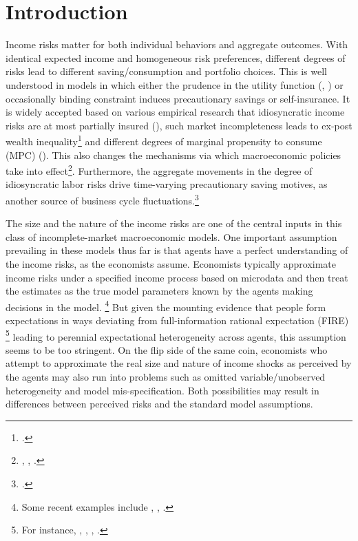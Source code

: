 
    \hypertarget{introduction}{%
\section{Introduction}\label{introduction}}

Income risks matter for both individual behaviors and aggregate
outcomes. With identical expected income and homogeneous risk
preferences, different degrees of risks lead to different
saving/consumption and portfolio choices. This is well understood in
models in which either the prudence in the utility function
(\cite{kimball1990precautionary}, \cite{carroll2001liquidity}) or occasionally binding constraint induces precautionary
savings or self-insurance. It is widely accepted based on various empirical research that
idiosyncratic income risks are at most partially insured
(\cite{blundell_consumption_2008}), such market incompleteness leads
to ex-post wealth inequality\footnote{\cite{ aiyagari1994uninsured,huggett1996wealth,carroll1997nature,krusell1998income}.} and different degrees of marginal
propensity to consume (MPC) (\cite{krueger2016macroeconomics, carroll2017distribution}). This also changes the mechanisms via which macroeconomic policies take into effect\footnote{\cite{krueger2016macroeconomics}, \cite{kaplan2018monetary}, \cite{auclert2019monetary}.}. Furthermore, the aggregate movements in the degree of idiosyncratic labor risks drive time-varying precautionary saving motives, as another source of business cycle fluctuations.\footnote{ \cite{challe2016precautionary, mckay2017time,heathcote2018wealth, kaplan2018microeconomic,den2018unemployment,bayer2019precautionary, acharya2020understanding,ravn2021macroeconomic}.}

The size and the nature of the income risks are one of the central inputs in this class of incomplete-market macroeconomic models. One important assumption prevailing in these models thus far is that agents have a perfect understanding of the
income risks, as the economists assume. Economists typically approximate income risks under a specified income process based on microdata and then treat the estimates
as the true model parameters known by the agents making decisions in the
model. \footnote{Some recent examples include \cite{krueger2016macroeconomics}, \cite{bayer2019precautionary}, \cite{kaplan2018monetary}.}
 But given the mounting evidence that people form expectations in ways
deviating from full-information rational expectation (FIRE) \footnote{For instance, \cite{mankiw2003disagreement}, \cite{reis2006inattentive}, \cite{coibion2012can}, \cite{wang2021infvar}.} leading to perennial
expectational heterogeneity across agents, this
assumption seems to be too stringent. On the flip side of the same coin, economists who attempt to approximate the real size and nature of income shocks as perceived by the agents may also run into problems such as omitted variable/unobserved heterogeneity and model mis-specification. Both possibilities may result in differences between perceived risks and the standard model assumptions. 

